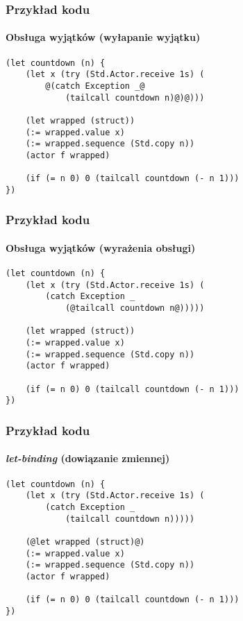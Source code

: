 \documentclass{beamer}
\begin{document}
\begin{frame}[fragile]
    \frametitle{Przykład kodu}
    \framesubtitle{Obsługa wyjątków (wyłapanie wyjątku)}

    \begin{small}
    \begin{lstlisting}
(let countdown (n) {
    (let x (try (Std.Actor.receive 1s) (
        @(catch Exception _@
            (tailcall countdown n)@)@)))

    (let wrapped (struct))
    (:= wrapped.value x)
    (:= wrapped.sequence (Std.copy n))
    (actor f wrapped)

    (if (= n 0) 0 (tailcall countdown (- n 1)))
})
    \end{lstlisting}
    \end{small}
\end{frame}

\begin{frame}[fragile]
    \frametitle{Przykład kodu}
    \framesubtitle{Obsługa wyjątków (wyrażenia obsługi)}

    \begin{small}
    \begin{lstlisting}
(let countdown (n) {
    (let x (try (Std.Actor.receive 1s) (
        (catch Exception _
            (@tailcall countdown n@)))))

    (let wrapped (struct))
    (:= wrapped.value x)
    (:= wrapped.sequence (Std.copy n))
    (actor f wrapped)

    (if (= n 0) 0 (tailcall countdown (- n 1)))
})
    \end{lstlisting}
    \end{small}
\end{frame}

\begin{frame}[fragile]
    \frametitle{Przykład kodu}
    \framesubtitle{\emph{let-binding} (dowiązanie zmiennej)}

    \begin{small}
    \begin{lstlisting}
(let countdown (n) {
    (let x (try (Std.Actor.receive 1s) (
        (catch Exception _
            (tailcall countdown n)))))

    (@let wrapped (struct)@)
    (:= wrapped.value x)
    (:= wrapped.sequence (Std.copy n))
    (actor f wrapped)

    (if (= n 0) 0 (tailcall countdown (- n 1)))
})
    \end{lstlisting}
    \end{small}
\end{frame}
\end{document}
